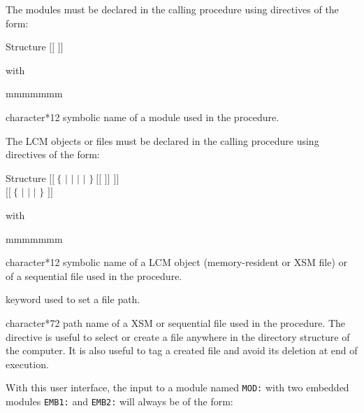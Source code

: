 The modules must be declared in the calling procedure using directives of the form:

\begin{DataStructure}{Structure }
 $[[$  $]]$ \moc{;} \\
\end{DataStructure}
\noindent with

\begin{ListeDeDescription}{mmmmmmm}

\item[\dusa{name}] character*12 symbolic name of a module used in the procedure.

\end{ListeDeDescription}

\vskip 0.4cm
\goodbreak

The LCM objects or files must be declared in the calling procedure using directives of the form:

\begin{DataStructure}{Structure }
$[[~\{$  $|$  $|$  $|$  $|$  $\}~[[$  $]]$ \moc{;} $]]$ \\
$[[~\{$  $|$  $|$  $|$  $\}$  \moc{::}   \moc{;} $]]$
\end{DataStructure}
\noindent with

\begin{ListeDeDescription}{mmmmmmm}

\item[\dusa{name}] character*12 symbolic name of a LCM object (memory-resident or XSM file) or of a sequential file used in the procedure.

\item[\moc{FILE}] keyword used to set a file path.

\item[\dusa{path}] character*72 path name of a XSM or sequential file used in the procedure. The  directive is useful to select or
create a file anywhere in the directory structure of the computer. It is also useful to tag a created file and avoid its deletion at end of
execution.

\end{ListeDeDescription}

\vskip 0.4cm

With this user interface, the input to a module named {\tt MOD:} with two
embedded modules {\tt EMB1:} and {\tt EMB2:} will always be of the form:


